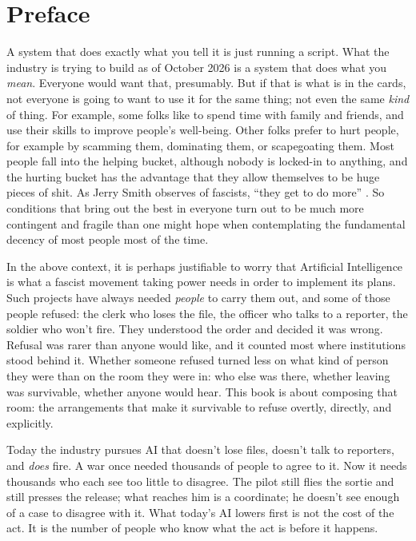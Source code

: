 \chapter*{Preface}
A system that does exactly what you tell it is just running a script. What the industry is trying to build as of October 2026 is a system that does what you \emph{mean}. Everyone would want that, presumably. But if that is what is in the cards, not everyone is going to want to use it for the same thing; not even the same \emph{kind} of thing. For example, some folks like to spend time with family and friends, and use their skills to improve people's well-being. Other folks prefer to hurt people, for example by scamming them, dominating them, or scapegoating them. Most people fall into the helping bucket, although nobody is locked-in to anything, and the hurting bucket has the advantage that they allow themselves to be huge pieces of shit. As Jerry Smith observes of fascists, “they get to do more” \autocite{rickandmorty2023}. So conditions that bring out the best in everyone turn out to be much more contingent and fragile than one might hope when contemplating the fundamental decency of most people most of the time.

In the above context, it is perhaps justifiable to worry that Artificial Intelligence is what a fascist movement taking power needs in order to implement its plans. Such projects have always needed \emph{people} to carry them out, and some of those people refused: the clerk who loses the file, the officer who talks to a reporter, the soldier who won't fire. They understood the order and decided it was wrong. Refusal was rarer than anyone would like, and it counted most where institutions stood behind it. Whether someone refused turned less on what kind of person they were than on the room they were in: who else was there, whether leaving was survivable, whether anyone would hear. This book is about composing that room: the arrangements that make it survivable to refuse overtly, directly, and explicitly.

Today the industry pursues AI that doesn't lose files, doesn't talk to reporters, and \emph{does} fire. A war once needed thousands of people to agree to it. Now it needs thousands who each see too little to disagree. The pilot still flies the sortie and still presses the release; what reaches him is a coordinate; he doesn't see enough of a case to disagree with it. What today's AI lowers first is not the cost of the act. It is the number of people who know what the act is before it happens.

